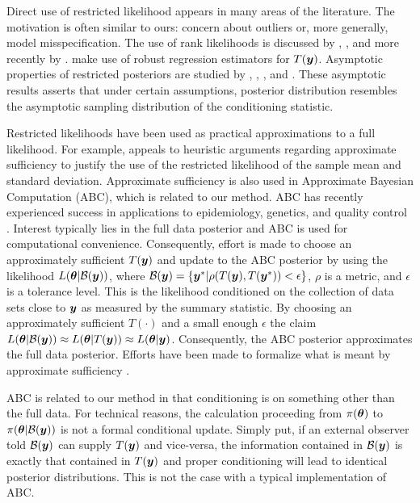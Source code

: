\documentclass[11pt]{article}
\def\bth{\mbox{\boldmath $\theta$}}
\newcommand{\by}{\mbox{\boldmath $y$}}
\begin{document}
Direct use of restricted likelihood appears in many areas of the literature.  The motivation is often similar to ours:   
concern about outliers or, more generally, model misspecification.  The use of rank likelihoods is discussed by \cite{savage1969}, \cite{pettitt1983, pettitt1982}, and more recently by \cite{hoff2013}.  \cite{lewis2012} make use of robust regression estimators for $T(\by)$.
Asymptotic properties of restricted posteriors are studied by \cite{doksum1990}, \cite{clarke1995}, \cite{yuan2004},  and \cite{hwang2005}. These asymptotic results asserts that under certain assumptions, posterior distribution resembles the asymptotic sampling distribution of the conditioning statistic.  

Restricted likelihoods have been used as practical approximations to a full likelihood. For example, \cite{pratt1965} appeals to heuristic arguments regarding approximate sufficiency to justify the use of the restricted likelihood of the sample mean and standard deviation. Approximate sufficiency is also used in Approximate Bayesian Computation (ABC), which is related to our method.  
ABC has recently experienced success in applications to epidemiology, genetics, and quality control \citep[see, for example,][]{tavare1997, pritchard1999,  marjoram2003, fearnhead2012}. Interest typically lies in the full data posterior and ABC is used for computational convenience.  Consequently, effort is made to choose an approximately sufficient $T(\by)$ and update to the ABC posterior by using the likelihood $L(\bth| \mathcal{B}(\by))$, where $\mathcal{B}(\by)=\{\by^{*}|\rho(T(\by),T(\by^{*}))<\epsilon\}$, $\rho$ is a metric, and $\epsilon$ is a tolerance level. This is the likelihood conditioned on the collection of data sets close to $\by$ as measured by the summary statistic. By choosing an approximately sufficient $T(\cdot)$ and a small enough $\epsilon$ the claim $L(\bth|\mathcal{B}(\by))\approx L(\bth|T(\by))\approx L(\bth|\by)$. Consequently, the ABC posterior approximates the full data posterior. Efforts have been made to formalize what is meant by  approximate sufficiency \citep[e.g.,][]{joyce2008}.

ABC is related to our method in that conditioning is on something other than the full data. For technical reasons, the calculation proceeding from $\pi(\bth)$ to $\pi(\bth | \mathcal{B}(\by))$ is not a formal conditional update.  Simply put, if an external observer told $\mathcal{B}(\by)$ can supply $T(\by)$ and vice-versa, the information contained in $\mathcal{B}(\by)$ is exactly that contained in $T(\by)$ and proper conditioning will lead to identical posterior distributions.  This is not the case with a typical implementation of ABC.  
\end{document}
